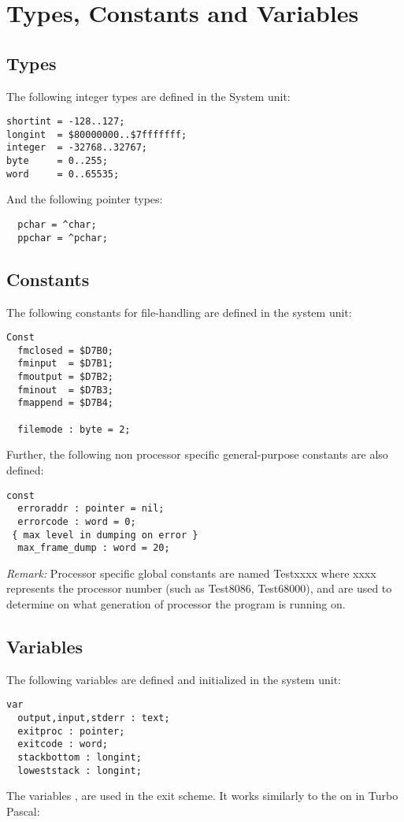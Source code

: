 \documentclass{report}
\begin{document}
\section{Types, Constants and Variables}
\subsection{Types}
The following integer types are defined in the System unit:
\begin{verbatim}
shortint = -128..127;
longint  = $80000000..$7fffffff;
integer  = -32768..32767;
byte     = 0..255;
word     = 0..65535;
\end{verbatim}


And the following pointer types:
\begin{verbatim}
  pchar = ^char;
  ppchar = ^pchar;
\end{verbatim}

\subsection{Constants}
The following constants for file-handling are defined in the system unit:
\begin{verbatim}
Const
  fmclosed = $D7B0;
  fminput  = $D7B1;
  fmoutput = $D7B2;
  fminout  = $D7B3;
  fmappend = $D7B4;

  filemode : byte = 2;
\end{verbatim}
Further, the following non processor specific general-purpose constants
are also defined:
\begin{verbatim} 
const
  erroraddr : pointer = nil;
  errorcode : word = 0;
 { max level in dumping on error }
  max_frame_dump : word = 20;
\end{verbatim}

\emph{ Remark: } Processor specific global constants are named Testxxxx
where xxxx represents the processor number (such as Test8086, Test68000),
and are used to determine on what generation of processor the program
is running on.

\subsection{Variables}
The following variables are defined and initialized in the system unit:
\begin{verbatim}
var
  output,input,stderr : text;
  exitproc : pointer;
  exitcode : word;
  stackbottom : longint;
  loweststack : longint;
\end{verbatim}
The variables ,  are used in the \fpc exit
scheme. It works similarly to the on in Turbo Pascal:
\end{document}
